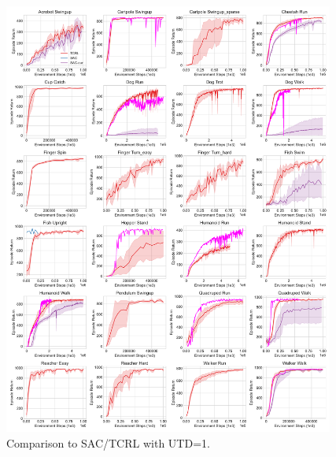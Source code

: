 \documentclass{article}
\theoremstyle{plain}
\theoremstyle{definition}
\theoremstyle{remark}
\begin{document}
\begin{figure}[ht]
\vskip 0.2in
\begin{center}
\centerline{\includegraphics[width=0.97\textwidth]{./figs/all_mujoco_envs.pdf}}
\caption{Comparison to SAC/TCRL with UTD=1.}
\label{fig:main_plot}
\end{center}
\vskip -0.2in
\end{figure}
\end{document}
